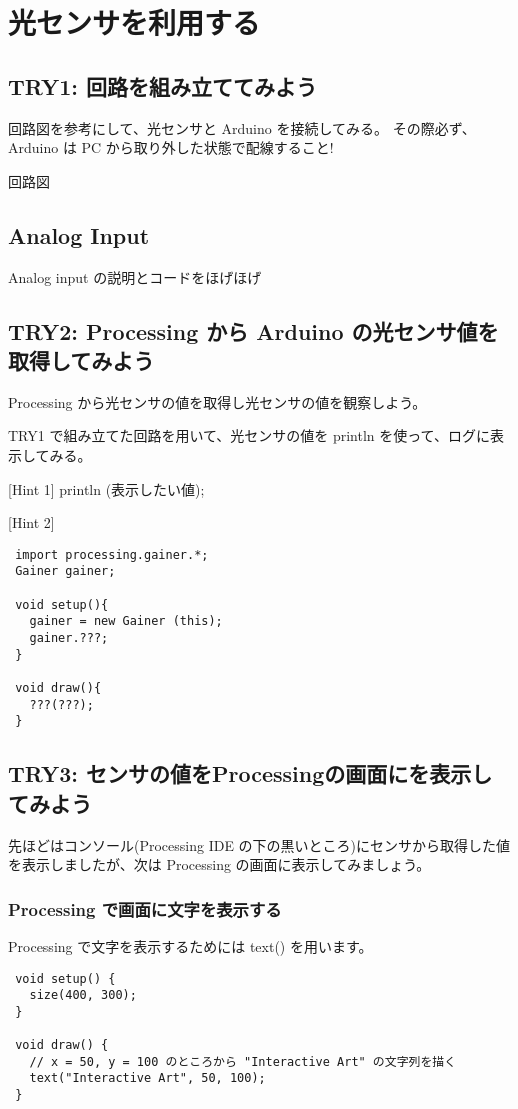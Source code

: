 \documentclass[11pt,a4paper]{jarticle}
\begin{document}
\section{光センサを利用する}

\subsection*{TRY1: 回路を組み立ててみよう}
回路図を参考にして、光センサと Arduino を接続してみる。
その際必ず、Arduino は PC から取り外した状態で配線すること!

回路図

\subsection*{Analog Input}
Analog input の説明とコードをほげほげ


\subsection*{TRY2: Processing から Arduino の光センサ値を取得してみよう}
Processing から光センサの値を取得し光センサの値を観察しよう。

TRY1 で組み立てた回路を用いて、光センサの値を println を使って、ログに表示してみる。

[Hint 1]
println (表示したい値);

[Hint 2]

\begin{lstlisting}
 import processing.gainer.*;
 Gainer gainer;

 void setup(){
   gainer = new Gainer (this);
   gainer.???;
 }

 void draw(){
   ???(???);
 }
\end{lstlisting}


\subsection*{TRY3: センサの値をProcessingの画面にを表示してみよう}
先ほどはコンソール(Processing IDE の下の黒いところ)にセンサから取得した値を表示しましたが、次は Processing の画面に表示してみましょう。

\subsubsection*{Processing で画面に文字を表示する}
Processing で文字を表示するためには text() を用います。
\begin{lstlisting}
 void setup() {
   size(400, 300);
 }

 void draw() {
   // x = 50, y = 100 のところから "Interactive Art" の文字列を描く
   text("Interactive Art", 50, 100);
 }
\end{lstlisting}
\end{document}

